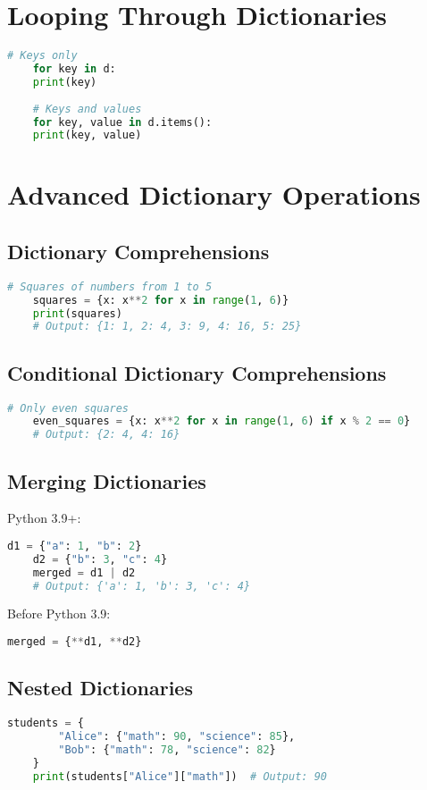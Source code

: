 \section{Looping Through Dictionaries}
\begin{lstlisting}[language=Python]
	# Keys only
	for key in d:
	print(key)
	
	# Keys and values
	for key, value in d.items():
	print(key, value)
\end{lstlisting}

\section{Advanced Dictionary Operations}

\subsection{Dictionary Comprehensions}
\begin{lstlisting}[language=Python]
	# Squares of numbers from 1 to 5
	squares = {x: x**2 for x in range(1, 6)}
	print(squares)
	# Output: {1: 1, 2: 4, 3: 9, 4: 16, 5: 25}
\end{lstlisting}

\subsection{Conditional Dictionary Comprehensions}
\begin{lstlisting}[language=Python]
	# Only even squares
	even_squares = {x: x**2 for x in range(1, 6) if x % 2 == 0}
	# Output: {2: 4, 4: 16}
\end{lstlisting}

\subsection{Merging Dictionaries}
Python 3.9+:
\begin{lstlisting}[language=Python]
	d1 = {"a": 1, "b": 2}
	d2 = {"b": 3, "c": 4}
	merged = d1 | d2
	# Output: {'a': 1, 'b': 3, 'c': 4}
\end{lstlisting}

Before Python 3.9:
\begin{lstlisting}[language=Python]
	merged = {**d1, **d2}
\end{lstlisting}

\subsection{Nested Dictionaries}
\begin{lstlisting}[language=Python]
	students = {
		"Alice": {"math": 90, "science": 85},
		"Bob": {"math": 78, "science": 82}
	}
	print(students["Alice"]["math"])  # Output: 90
\end{lstlisting}

